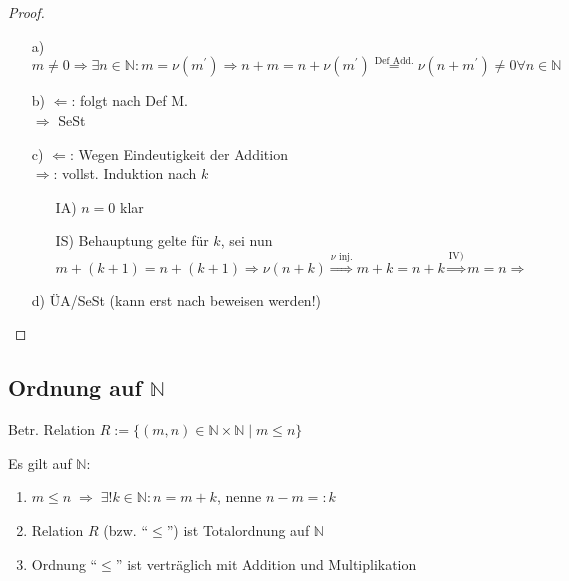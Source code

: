 \begin{proof}
	\begin{itemize}
		\item[a)] $m \neq 0 \Rightarrow \exists n \in \mathbb{N} \colon m = \nu(m^{'}) \Rightarrow n + m = n + \nu(m^{'}) \overset{\text{Def Add.}}{=} \nu(n+m^{'}) \neq 0 \forall n \in \mathbb{N}$
		\item[b)] $\Leftarrow$: folgt nach Def M. \\ $\Rightarrow$ SeSt
		\item[c)] $\Leftarrow$: Wegen Eindeutigkeit der Addition\\
		$\Rightarrow$: vollst. Induktion nach $k$
			\begin{itemize}
				\item[IA)] $n = 0$ klar
				\item[IS)] Behauptung gelte für $k$, sei nun $m+(k+1) = n + (k+1) \Rightarrow \nu(n+k) \overset{\nu \text{ inj.}}{\Rightarrow} m+k = n+k \overset{\text{IV)}}{\Rightarrow} m = n \Rightarrow$
			\end{itemize}
		\item[d)]ÜA/SeSt (kann erst nach  beweisen werden!)
	\end{itemize}
\end{proof}

\subsection{Ordnung auf $\boldsymbol{\mathbb{N}}$}
\begin{definition}
	Betr. Relation $R:=\{(m,n) \in\mathbb{N}\times\mathbb{N} \mid m \le n\}$
\end{definition}
\begin{proposition}
	Es gilt auf $\mathbb{N}$:
	\begin{enumerate}[label={\arabic*)}]
		\item $m\le n \;\Rightarrow \;\exists!k\in\mathbb{N}: n = m + k$, nenne $n - m=:k$ 
		\item Relation $R$ (bzw. "`$\le$"') ist Totalordnung auf $\mathbb{N}$
		\item Ordnung "`$\leq$"' ist verträglich mit Addition und Multiplikation
	\end{enumerate}
\end{proposition}

